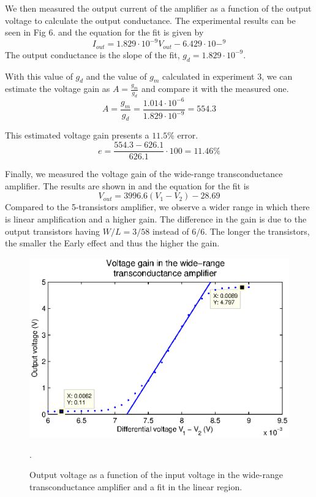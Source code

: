 We then measured the output current of the amplifier as a function of the output voltage to calculate the output conductance. The experimental results can be seen in Fig 6. and the equation for the fit is given by
\begin{equation*}
I_{out}=1.829\cdot10^{-9}V_{out}-6.429\cdot10-^{9}
\end{equation*}
The output conductance is the slope of the fit, \(g_d = 1.829\cdot10^{-9}\). 

With this value of \(g_d\) and the value of \(g_m\) calculated in experiment 3,  we can estimate the voltage gain as \(A=\frac{g_m}{g_d}\) and compare it with the measured one. 
\begin{equation*}
A=\frac{g_m}{g_d}=\frac{1.014\cdot10^{-6}}{1.829\cdot10^{-9}}=554.3
\end{equation*}

This estimated voltage gain presents a \(11.5\%\) error.
\begin{equation*}
e=\frac{554.3-626.1}{626.1}\cdot100=11.46\%
\end{equation*}

Finally, we measured the voltage gain of the wide-range transconductance amplifier. The results are shown in  and the equation for the fit is
\begin{equation*}
V_{out}=3996.6(V_1-V_2)-28.69
\end{equation*}
Compared to the 5-transistors amplifier, we observe a wider range in which there is linear amplification and a higher gain. The difference in the gain is due to the output transistors having \(W/L=3/58\) instead of \(6/6\). The longer the transistors, the smaller the Early effect and thus the higher the gain. 

\begin{figure}
	\center
	\includegraphics{q4c.eps}
	\caption{Output voltage as a function of the input voltage in the wide-range transconductance amplifier and a fit in the linear region.} .
	\label{fig:ex4c}
\end{figure}


